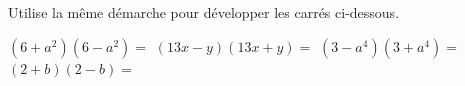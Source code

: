 %
%
Utilise la même démarche pour développer les carrés ci-dessous.
  \begin{tasks}
    \task $\left(6+a^2\right)\left(6-a^2\right)=$
    \task $\left(13x-y\right)\left(13x+y\right)=$
    \task $\left(3-a^4\right)\left(3+a^4\right)=$
    \task $\left(2+b\right)\left(2-b\right)=$
  \end{tasks}
